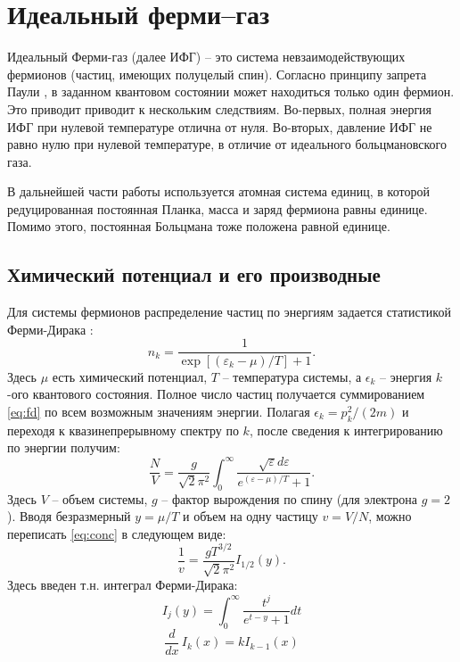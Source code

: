 \chapter{Идеальный ферми--газ}
Идеальный Ферми-газ (далее ИФГ) -- это система невзаимодействующих фермионов (частиц, имеющих полуцелый спин).
Согласно принципу запрета Паули \cite{Pauli:ZP:1925,Pauli:PR:1940}, в заданном квантовом состоянии может находиться только один фермион.
Это приводит приводит к нескольким следствиям.
Во-первых, полная энергия ИФГ при нулевой температуре отлична от нуля.
Во-вторых, давление ИФГ не равно нулю при нулевой температуре, в отличие от идеального больцмановского газа.

В дальнейшей части работы используется атомная система единиц, в которой редуцированная постоянная Планка, масса и заряд фермиона равны единице.
Помимо этого, постоянная Больцмана тоже положена равной единице.

\section{Химический потенциал и его производные}
Для системы фермионов распределение частиц по энергиям задается статистикой Ферми-Дирака \cite{Landau:statmech:1958}:
\begin{equation}
    n_k = \frac{1}{\exp{[(\varepsilon_k - \mu)/T]} + 1}.
    \label{eq:fd}
\end{equation}
Здесь $\mu$ есть химический потенциал, $T$ -- температура системы, а $\epsilon_k$ -- энергия $k$-ого квантового состояния.
Полное число частиц получается суммированием \eqref{eq:fd} по всем возможным значениям энергии.
Полагая $\epsilon_k = p^2_{k} / (2m)$ и переходя к квазинепрерывному спектру по $k$, после сведения к интегрированию по энергии получим:
\begin{equation}
    \label{eq:conc}
    \frac{N}{V}=\frac{g}{\sqrt{2} \pi^{2}} \int_{0}^{\infty} \frac{\sqrt{\varepsilon} d \varepsilon}{e^{(\varepsilon-\mu) / T}+1}.
\end{equation}
Здесь $V$ -- объем системы, $g$ -- фактор вырождения по спину (для электрона $g = 2$).
Вводя безразмерный $y = \mu / T$ и объем на одну частицу $v = V / N$, можно переписать \eqref{eq:conc} в следующем виде:
\begin{equation}
    \frac{1}{v} = \frac{g T^{3/2}}{\sqrt{2}\pi^2}I_{1/2}(y).
    \label{eq:mu_equation}
\end{equation}
Здесь введен т.н. интеграл Ферми-Дирака:
\begin{equation}
    \label{eq:fermi-dirak_integral_definition}
    I_{j}(y)= \int_{0}^{\infty} \frac{t^{j}}{e^{t-y}+1} dt
\end{equation}
\begin{equation}
    \label{eq:ifg_diff_rule}
    \frac{d}{dx}\, I_k (x) = k I _{k-1} (x)
\end{equation}

